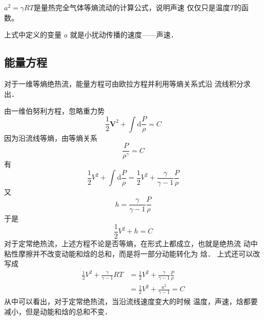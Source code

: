 \begin{notice}
$a^2=\gamma R T $是量热完全气体等熵流动的计算公式，说明声速
仅仅只是温度$T$的函数。
\end{notice}

上式中定义的变量 $ a $ 就是小扰动传播的速度——声速．

\subsection{能量方程}

对于一维等熵绝热流，能量方程可由欧拉方程并利用等熵关系式沿
流线积分求出．

由一维伯努利方程，忽略重力势
\[
	\frac{1}{2 }\mathbf{V}^2+\int \mathrm{d}\frac{P}{\rho}=C
\]
因为沿流线等熵，由等熵关系
\[
	\frac{P}{\rho^\gamma}=C
\]
有
\[
	\frac{1}{2 }V^2+\int \mathrm{d}\frac{P}{\rho}=\frac{1}{2 }V^2+\frac{\gamma}{\gamma-1 }\frac{P}{\rho}
\]
又
\[
	h=\frac{\gamma}{\gamma-1 }\frac{P}{\rho}
\]
于是
\[
	\frac{1}{2 }V^2+h=C
\]
对于定常绝热流，上述方程不论是否等熵，在形式上都成立，也就是绝热流
动中粘性摩擦并不改变动能和焓的总和，而是将一部分动能转化为
焓． 上式还可以改写成
\begin{equation}
	\begin{split}
		\frac{1}{2 }V^2+\frac{\gamma}{\gamma-1}RT & =
		\frac{1}{2 }V^2+\frac{\gamma}{\gamma-1}\frac{P}{\rho}                                \\
		                                          & =\frac{1}{2 }V^2+\frac{a^2}{\gamma-1} =C
	\end{split}
	\label{eq:8 }
\end{equation}
从中可以看出，对于定常绝热流，当沿流线速度变大的时候
温度，声速，焓都要减小，但是动能和焓的总和不变．

